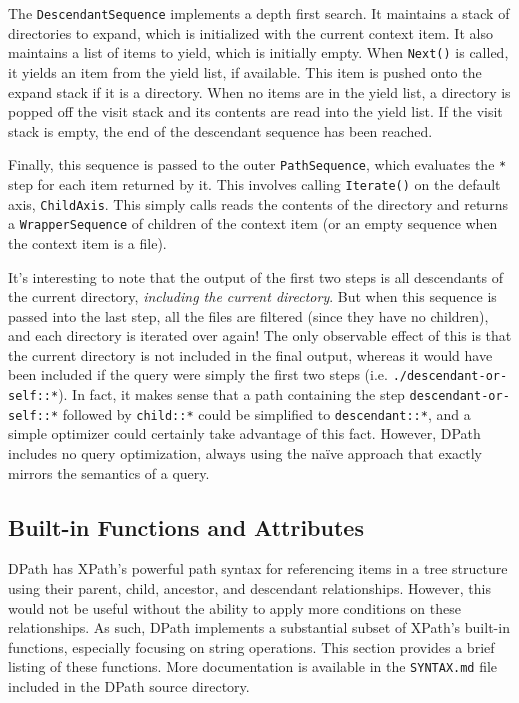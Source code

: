 \documentclass{scrartcl}
\begin{document}
The \texttt{DescendantSequence} implements a depth first search. It maintains a
stack of directories to expand, which is initialized with the current context
item. It also maintains a list of items to yield, which is initially empty. When
\texttt{Next()} is called, it yields an item from the yield list, if available.
This item is pushed onto the expand stack if it is a directory. When no items
are in the yield list, a directory is popped off the visit stack and its
contents are read into the yield list. If the visit stack is empty, the end of
the descendant sequence has been reached.

Finally, this sequence is passed to the outer \texttt{PathSequence}, which
evaluates the \texttt{*} step for each item returned by it. This involves
calling \texttt{Iterate()} on the default axis, \texttt{ChildAxis}. This simply
calls reads the contents of the directory and returns a \texttt{WrapperSequence}
of children of the context item (or an empty sequence when the context item is a
file).

It's interesting to note that the output of the first two steps is all
descendants of the current directory, \emph{including the current directory}.
But when this sequence is passed into the last step, all the files are filtered
(since they have no children), and each directory is iterated over again! The
only observable effect of this is that the current directory is not included in
the final output, whereas it would have been included if the query were simply
the first two steps (i.e. \texttt{./descendant-or-self::*}). In fact, it makes
sense that a path containing the step \texttt{descendant-or-self::*} followed by
\texttt{child::*} could be simplified to \texttt{descendant::*}, and a simple
optimizer could certainly take advantage of this fact. However, DPath includes
no query optimization, always using the na\"ive approach that exactly mirrors
the semantics of a query.

\subsection{Built-in Functions and Attributes}

DPath has XPath's powerful path syntax for referencing items in a tree structure
using their parent, child, ancestor, and descendant relationships. However, this
would not be useful without the ability to apply more conditions on these
relationships. As such, DPath implements a substantial subset of XPath's
built-in functions, especially focusing on string operations. This section
provides a brief listing of these functions. More documentation is available in
the \texttt{SYNTAX.md} file included in the DPath source directory.
\end{document}
